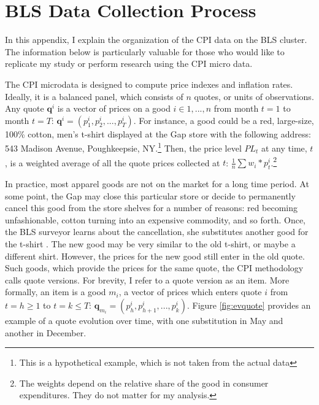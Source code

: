 \documentclass[12pt]{article}
\begin{document}
	

		\section{BLS Data Collection Process}
		
		\label{sec:dcp}
		In this appendix, I explain the organization of the CPI data on the BLS cluster. The information below is particularly valuable for those who would like to replicate my study or perform research using the CPI micro data.
		
		
		The CPI microdata is designed to compute price indexes and inflation rates.
		Ideally, it is a balanced panel, which consists of $n$ quotes, or units of observations.
		Any quote $\mathbf{q}^{i}$ is a vector of prices on a good $i \in {1,...,n}$ from month $t=1$ to month $t=T$: $\mathbf{q}^{i}=(p^{i}_1,p^{i}_2,...,p^{i}_T)$. For instance, a good could be a red, large-size, 100\% cotton, men's t-shirt displayed at the Gap store with the following address: 543 Madison Avenue, Poughkeepsie, NY.\footnote{This is a hypothetical example, which is not taken from the actual data} Then, the price level $PL_t$ at any 
		time, $t$, is a weighted average of all the quote prices collected at $t$: $\frac{1}{n}\sum{w_i*p^{i}_t}$.\footnote{The weights depend on the relative share of the good in consumer expenditures. They do not matter for my analysis.}
		
		In practice, most apparel goods are not on the market for a long time period. At some point, the Gap may close this particular store or decide to permanently cancel this good from the store shelves for a number of reasons: red becoming unfashionable, cotton turning into an expensive commodity, and so forth. Once, the BLS surveyor learns about the cancellation, she substitutes another good for the t-shirt . The new good may be very similar to the old t-shirt, or maybe a different shirt. However, the prices for the new good still enter in the old quote.  Such goods, which provide the prices for the same quote, the CPI methodology calls quote versions. For brevity, I refer to a quote version as an item. More formally, an item is a good $m_i$, a vector of prices which enters quote $i$ from $t=h  \geq 1 $ to $t=k \leq T$: $\mathbf{q}_{m_i}=(p^{i}_h,p^{i}_{h+1},...,p^{i}_k)$.  Figure \ref{fig:evquote} provides an example of a quote evolution over time, with one substitution in May and another in December. 
		
		
		
\end{document}
